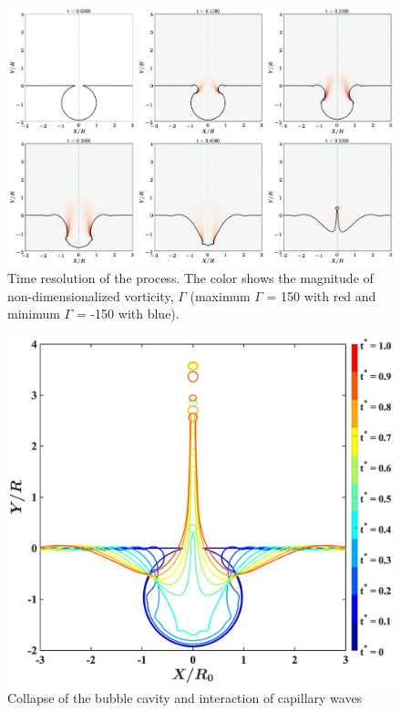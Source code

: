 \documentclass[a4paper,10pt]{article}
\begin{document}
\begin{figure}[H]
\begin{center}
 \includegraphics[width=\textwidth]{temporal.png}
 \caption{Time resolution of the process. The color shows the magnitude of non-dimensionalized vorticity, $\Gamma$ (maximum $\Gamma$ = 150 with red and minimum $\Gamma$ = -150 with blue).}
 \label{Figure::Typical}
\end{center}
\end{figure}
\begin{figure}[H]
\begin{center}
 \includegraphics[width=\textwidth]{interface.eps}
 \caption{Collapse of the bubble cavity and interaction of capillary waves}
 \label{Figure::Waves}
\end{center}
\end{figure}
\end{document}

